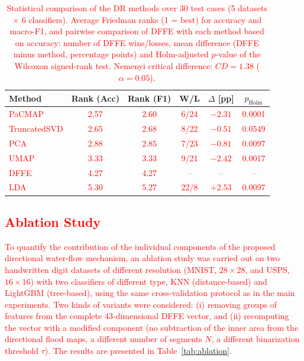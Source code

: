 \documentclass[a4paper,fleqn]{cas-dc}
\begin{document}
\begin{table}
    \centering
    \caption{\textcolor{red}{Statistical comparison of the DR methods over 30 test cases (5 datasets $\times$ 6 classifiers). Average Friedman ranks (1 = best) for accuracy and macro-F1, and pairwise comparison of DFFE with each method based on accuracy: number of DFFE wins/losses, mean difference (DFFE minus method, percentage points) and Holm-adjusted $p$-value of the Wilcoxon signed-rank test. Nemenyi critical difference: $CD = 1.38$ ($\alpha = 0.05$).}}
    \label{tab:statistics}
    \begin{tabular}{l|cc|ccc}
        \hline
        \textbf{Method} & \textbf{Rank (Acc)} & \textbf{Rank (F1)} & \textbf{W/L} & \textbf{$\Delta$ [pp]} & \textbf{$p_{\mathrm{Holm}}$} \\
        \hline
        \textcolor{red}{PaCMAP}       & \textcolor{red}{2.57} & \textcolor{red}{2.60} & \textcolor{red}{6/24}  & \textcolor{red}{$-2.31$} & \textcolor{red}{0.0001} \\
        \textcolor{red}{TruncatedSVD} & \textcolor{red}{2.65} & \textcolor{red}{2.68} & \textcolor{red}{8/22}  & \textcolor{red}{$-0.51$} & \textcolor{red}{0.0549} \\
        \textcolor{red}{PCA}          & \textcolor{red}{2.88} & \textcolor{red}{2.85} & \textcolor{red}{7/23}  & \textcolor{red}{$-0.81$} & \textcolor{red}{0.0097} \\
        \textcolor{red}{UMAP}         & \textcolor{red}{3.33} & \textcolor{red}{3.33} & \textcolor{red}{9/21}  & \textcolor{red}{$-2.42$} & \textcolor{red}{0.0017} \\
        \textcolor{red}{DFFE}         & \textcolor{red}{4.27} & \textcolor{red}{4.27} & \textcolor{red}{--}    & \textcolor{red}{--}      & \textcolor{red}{--} \\
        \textcolor{red}{LDA}          & \textcolor{red}{5.30} & \textcolor{red}{5.27} & \textcolor{red}{22/8}  & \textcolor{red}{$+2.53$} & \textcolor{red}{0.0097} \\
        \hline
    \end{tabular}
\end{table}

\subsection{\textcolor{red}{Ablation Study}}

\textcolor{red}{To quantify the contribution of the individual components of the proposed directional water-flow mechanism, an ablation study was carried out on two handwritten digit datasets of different resolution (MNIST, $28\times28$, and USPS, $16\times16$) with two classifiers of different type, KNN (distance-based) and LightGBM (tree-based), using the same cross-validation protocol as in the main experiments. Two kinds of variants were considered: (i) removing groups of features from the complete 43-dimensional DFFE vector, and (ii) recomputing the vector with a modified component (no subtraction of the inner area from the directional flood maps, a different number of segments $N$, a different binarization threshold $\tau$). The results are presented in Table~\ref{tab:ablation}.}
\end{document}
